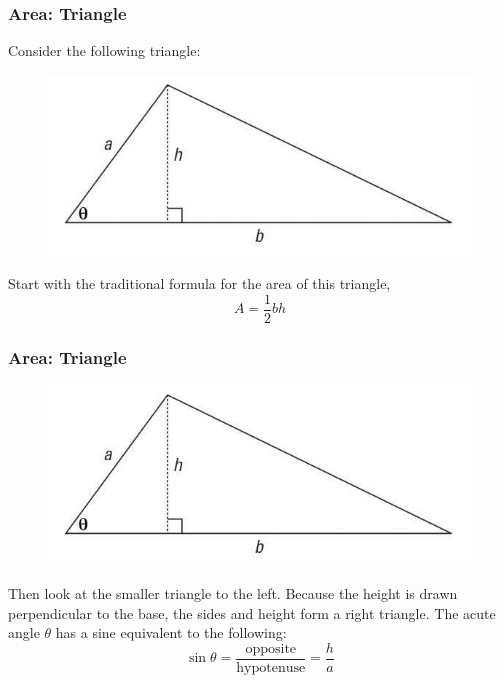\documentclass[xcolor=dvipsnames]{beamer}
\begin{document}
\begin{frame}
  \frametitle{Area: Triangle}
  Consider the following triangle:
  \begin{figure}[h]
    \includegraphics[scale=.5]{./areatri.png}
  \end{figure}
  Start with the traditional formula for the area of this triangle,
  \begin{equation}
    \label{eq:oquehota}
    A=\frac{1}{2}bh
  \end{equation}
\end{frame}

\begin{frame}
  \frametitle{Area: Triangle}
  \begin{figure}[h]
    \includegraphics[scale=.5]{./areatri.png}
  \end{figure}
  Then look at the smaller triangle to the left. Because the height is
  drawn perpendicular to the base, the sides and height form a right
  triangle. The acute angle $\theta$ has a sine equivalent to the
  following:
  \begin{equation}
    \label{eq:ayooshoh}
    \sin\theta=\frac{\mbox{opposite}}{\mbox{hypotenuse}}=\frac{h}{a}
  \end{equation}
\end{frame}
\end{document}
